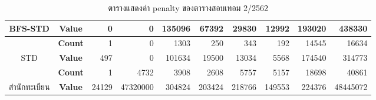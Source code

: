 \begin{table}[]
{\begin{tabular}{@{}ccrrrrrrrr@{}}
    \multirow{-2}{*}{BFS-STD}                    & \textbf{Value}                        & 0                          & 0                        & 135096                        & 67392                        & 29830                        & 12992                       & 193020                        & 438330                        \\ \midrule
    {\color[HTML]{FE0000} }                      & {\color[HTML]{FE0000} \textbf{Count}} & {\color[HTML]{FE0000} 1}   & {\color[HTML]{FE0000} 0} & {\color[HTML]{FE0000} 1303}   & {\color[HTML]{FE0000} 250}   & {\color[HTML]{FE0000} 343}   & {\color[HTML]{FE0000} 192}  & {\color[HTML]{FE0000} 14545}  & {\color[HTML]{FE0000} 16634}  \\ \cmidrule(l){2-10} 
    \multirow{-2}{*}{{\color[HTML]{FE0000} STD}} & {\color[HTML]{FE0000} \textbf{Value}} & {\color[HTML]{FE0000} 497} & {\color[HTML]{FE0000} 0} & {\color[HTML]{FE0000} 101634} & {\color[HTML]{FE0000} 19500} & {\color[HTML]{FE0000} 13034} & {\color[HTML]{FE0000} 5568} & {\color[HTML]{FE0000} 174540} & {\color[HTML]{FE0000} 314773} \\ \midrule
                                                 & \textbf{Count}                        & 1                          & 4732                     & 3908                          & 2608                         & 5757                         & 5157                        & 18698                         & 40861                         \\ \cmidrule(l){2-10} 
    \multirow{-2}{*}{สำนักทะเบียน}                  & \textbf{Value}                        & 24129                      & 47320000                 & 304824                        & 203424                       & 218766                       & 149553                      & 224376                        & 48445072                      \\ \bottomrule
    \end{tabular}%
    }
    \caption{ตารางแสดงค่า penalty ของตารางสอบเทอม 2/2562}
    \label{tab:result_table_262}
\end{table}
